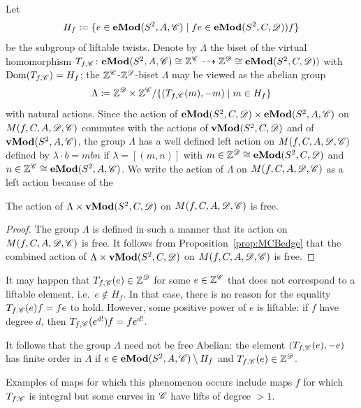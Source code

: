 \documentclass{amsart}
\begin{document}
Let
\begin{equation}\label{eq:defn:H_f}
  H_f\coloneqq \{e\in  \Mod[e](S^2,A,\CC) \mid f e\in  \Mod[e](S^2,C,\DD))f\}
\end{equation}
be the subgroup of liftable twists. Denote by $\Lambda$ the biset of the
virtual homomorphism $T_{f,\CC}\colon \Mod[e](S^2,A,\CC) \cong
\Z^\CC\dashrightarrow \Z^\DD\cong \Mod[e](S^2,C,\DD))$ with
$\operatorname{Dom}(T_{f,\CC})= H_f$; the $\Z^\CC$-$\Z^\DD$-biset $\Lambda$
may be viewed as the abelian group
\begin{equation}\label{eq:defn:Lambda}
  \Lambda\coloneqq \Z^\DD\times \Z^\CC/\{(T_{f,\CC}(m), -m)\mid m\in H_f\}
\end{equation}
with natural actions. Since the action of $\Mod[e](S^2,C,\DD)\times
\Mod[e](S^2,A,\CC)$ on $M(f,C,A,\DD,\CC)$ commutes with the actions of
$\Mod[v](S^2,C,\DD)$ and of $\Mod[v](S^2,A,\CC)$, the group $\Lambda$ has a
well defined left action on $M(f,C,A,\DD,\CC)$ defined by $\lambda \cdot b=
m b n$ if $\lambda =[(m,n)]$ with $m\in\Z^\DD\cong\Mod[e](S^2,C,\DD)$ and
$n\in\Z^\CC\cong\Mod[e](S^2,A,\CC)$. We write the action of $\Lambda$ on
$M(f,C,A,\DD,\CC)$ as a left action because of the
\begin{lem}
  The action of $\Lambda\times \Mod[v](S^2,C,\DD)$ on
  $M(f,C,A,\DD,\CC)$ is free.
\end{lem}
\begin{proof}
  The group $\Lambda$ is defined in such a manner that its action on
  $M(f,C,A,\DD,\CC)$ is free. It follows from
  Proposition~\ref{prop:MCBedge} that the combined action of $\Lambda\times
  \Mod[v](S^2,C,\DD)$ on $M(f,C,A,\DD,\CC)$ is free.
\end{proof}

\begin{rem}
  It may happen that $T_{f,\CC}(e)\in\Z^\DD$ for some $e\in\Z^\CC$ that
  does not correspond to a liftable element, i.e.\ $e\notin H_f$. In that
  case, there is no reason for the equality $T_{f,\CC}(e)f=f e$ to
  hold. However, some positive power of $e$ is liftable: if $f$ have degree
  $d$, then $T_{f,\CC}(e^{d!})f=f e^{d!}$.

  It follows that the group $\Lambda$ need not be free Abelian: the element
  $(T_{f,\CC}(e),-e)$ has finite order in $\Lambda$ if
  $e\in\Mod[e](S^2,A,\CC)\setminus H_f$ and $T_{f,\CC}(e)\in\Z^\DD$.

  Examples of maps for which this phenomenon occurs include maps $f$ for
  which $T_{f,\CC}$ is integral but some curves in $\CC$ have lifts of
  degree $>1$. %
\end{rem}
\end{document}
